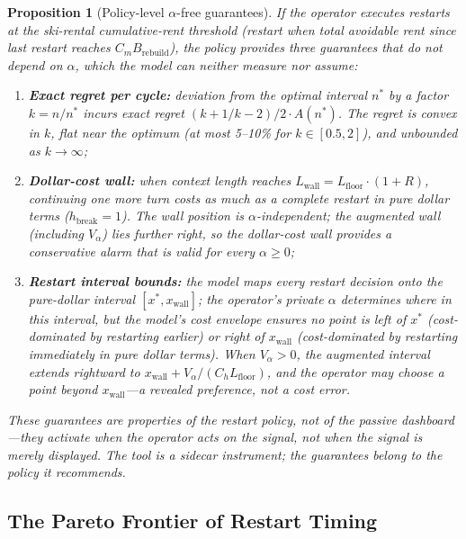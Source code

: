\documentclass[11pt]{article}
\newtheorem{proposition}[theorem]{Proposition}
\theoremstyle{definition}
\theoremstyle{remark}
\begin{document}
\begin{proposition}[Policy-level $\alpha$-free guarantees]
\label{prop:alphafree}
If the operator executes restarts at the ski-rental cumulative-rent threshold (restart when total avoidable rent since last restart reaches $C_m B_{\text{rebuild}}$), the policy provides three guarantees that do not depend on $\alpha$, which the model can neither measure nor assume:
\begin{enumerate}[leftmargin=*,itemsep=0pt,topsep=0pt]
\item \textbf{Exact regret per cycle:} deviation from the optimal interval $n^*$ by a factor $k = n/n^*$ incurs exact regret $(k + 1/k - 2)/2 \cdot A(n^*)$. The regret is convex in $k$, flat near the optimum (at most 5--10\% for $k \in [0.5, 2]$), and unbounded as $k \to \infty$;
\item \textbf{Dollar-cost wall:} when context length reaches $L_{\text{wall}} = L_{\text{floor}} \cdot (1 + R)$, continuing one more turn costs as much as a complete restart in pure dollar terms ($h_{\text{break}} = 1$). The wall position is $\alpha$-independent; the augmented wall (including $V_\alpha$) lies further right, so the dollar-cost wall provides a conservative alarm that is valid for every $\alpha \ge 0$;
\item \textbf{Restart interval bounds:} the model maps every restart decision onto the pure-dollar interval $[x^*, x_{\text{wall}}]$; the operator's private $\alpha$ determines \emph{where} in this interval, but the model's cost envelope ensures no point is left of $x^*$ (cost-dominated by restarting earlier) or right of $x_{\text{wall}}$ (cost-dominated by restarting immediately in pure dollar terms). When $V_\alpha > 0$, the augmented interval extends rightward to $x_{\text{wall}} + V_\alpha/(C_h L_{\text{floor}})$, and the operator may choose a point beyond $x_{\text{wall}}$---a revealed preference, not a cost error.
\end{enumerate}
These guarantees are properties of the restart policy, not of the passive dashboard---they activate when the operator acts on the signal, not when the signal is merely displayed. The tool is a sidecar instrument; the guarantees belong to the policy it recommends.
\end{proposition}

\subsection{The Pareto Frontier of Restart Timing}
\label{sec:pareto}
\end{document}
